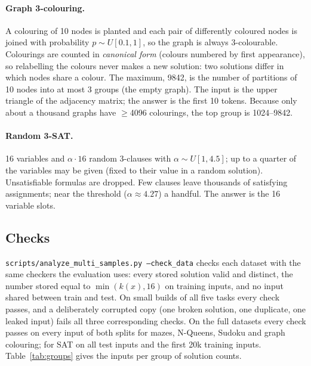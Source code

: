 \documentclass[11pt]{article}
\begin{document}
\paragraph{Graph 3-colouring.} A colouring of 10 nodes is planted and each pair of differently coloured nodes is joined
with probability $p\sim U[0.1, 1]$, so the graph is always 3-colourable. Colourings are counted in \emph{canonical
form} (colours numbered by first appearance), so relabelling the colours never makes a new solution: two solutions
differ in which nodes share a colour. The maximum, 9842, is the number of partitions of 10 nodes into at most 3
groups (the empty graph). The input is the upper triangle of the adjacency matrix; the answer is the first 10 tokens.
Because only about a thousand graphs have $\geq$4096 colourings, the top group is 1024--9842.

\paragraph{Random 3-SAT.} 16 variables and $\alpha\cdot 16$ random 3-clauses with $\alpha\sim U[1, 4.5]$; up to a
quarter of the variables may be given (fixed to their value in a random solution). Unsatisfiable formulas are
dropped. Few clauses leave thousands of satisfying assignments; near the threshold ($\alpha\approx4.27$) a handful.
The answer is the 16 variable slots.

\subsection{Checks}
\label{sec:checks}

\texttt{scripts/analyze\_multi\_samples.py --check\_data} checks each dataset with the same checkers the evaluation
uses: every stored solution valid and distinct, the number stored equal to $\min(k(x), 16)$ on training inputs, and
no input shared between train and test. On small builds of all five tasks every check passes, and a deliberately
corrupted copy (one broken solution, one duplicate, one leaked input) fails all three corresponding checks. On the full
datasets every check passes on every input of both splits for mazes, N-Queens, Sudoku and graph colouring; for SAT on all test inputs and the first 20k training inputs. Table~\ref{tab:groups} gives the inputs per group of solution counts.
\end{document}
